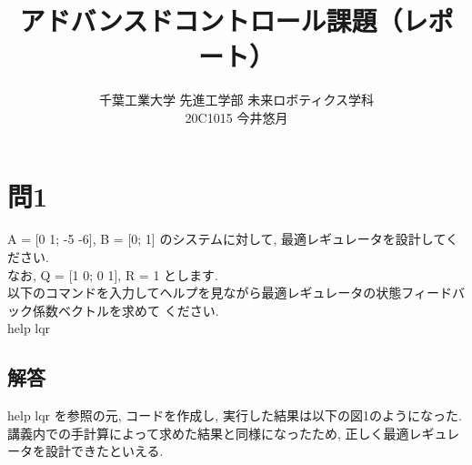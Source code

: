 \documentclass{jsarticle}
\begin{document}
\title{{\vspace*{-30mm}}{\LARGE アドバンスドコントロール課題（レポート）}}
\author{\large 千葉工業大学 先進工学部 未来ロボティクス学科 \vspace*{4mm}\\20C1015 今井悠月}
\date{}
\maketitle\vspace*{10mm}

\section*{問1}
A = [0 1; -5 -6], \hspace*{0.5zw}B = [0; 1] のシステムに対して, 最適レギュレータを設計してください.\\
\hspace*{1zw}なお, Q = [1 0; 0 1], \hspace*{0.5zw}R = 1 とします.\\
\hspace*{1zw}以下のコマンドを入力してヘルプを見ながら最適レギュレータの状態フィードバック係数ベクトルを求めて
\hspace*{1zw}ください.\vspace*{2mm}\\
\hspace*{1zw}help lqr\\

\vspace*{4mm}\subsection*{解答}
help lqr を参照の元, コードを作成し, 実行した結果は以下の図1のようになった.\\
\hspace*{1zw}講義内での手計算によって求めた結果と同様になったため, 正しく最適レギュレータを設計できたといえる.\\
\end{document}
